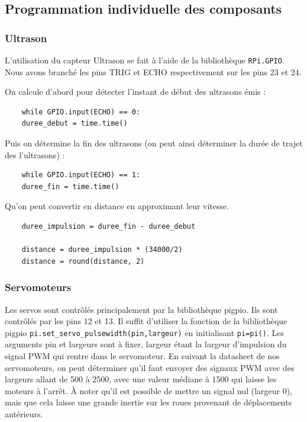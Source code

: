 \documentclass[a4paper,12pt]{report}  %
\begin{document}
\subsection{Programmation individuelle des composants}

\subsubsection{Ultrason}

L’utilisation du capteur Ultrason se fait à l’aide de la bibliothèque \texttt{RPi.GPIO}.
Nous avons branché les pins TRIG et ECHO respectivement sur les pins 23 et 24.

On calcule d’abord pour détecter l’instant de début des ultrasons émis :
\begin{lstlisting}
	while GPIO.input(ECHO) == 0:   
	duree_debut = time.time()
\end{lstlisting}

Puis on détermine la fin des ultrasons (on peut ainsi déterminer la durée de trajet des l’ultrasons) :
\begin{lstlisting}
	while GPIO.input(ECHO) == 1:
	duree_fin = time.time()
\end{lstlisting}

Qu’on peut convertir en distance en approximant leur vitesse.

\begin{lstlisting}
	duree_impulsion = duree_fin - duree_debut
	
	distance = duree_impulsion * (34000/2)
	distance = round(distance, 2)
\end{lstlisting}

\subsubsection{Servomoteurs}

Les servos sont contrôlés principalement par la bibliothèque pigpio.  
Ils sont contrôlés par les pins 12 et 13. Il suffit d’utiliser la fonction de la bibliothèque pigpio \texttt{pi.set\_servo\_pulsewidth(pin,largeur)} en initialisant \texttt{pi=pi()}. Les arguments pin et largeurs sont à fixer, largeur étant la largeur d’impulsion du signal PWM qui rentre dans le servomoteur. En suivant la datasheet de nos servomoteurs, on peut déterminer qu’il faut envoyer des signaux PWM avec des largeurs allant de 500 à 2500, avec une valeur médiane à 1500 qui laisse les moteurs à l’arrêt.
À noter qu’il est possible de mettre un signal nul (largeur 0), mais que cela laisse une grande inertie sur les roues provenant de déplacements antérieurs. 
\end{document}
